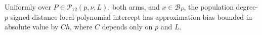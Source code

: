 Uniformly over \(P\in\mathcal P_{12}(p,\nu,L)\), both arms, and \(x\in\mathcal B_P\), the population degree-\(p\) signed-distance local-polynomial intercept has approximation bias bounded in absolute value by \(C h\), where \(C\) depends only on \(p\) and \(L\).